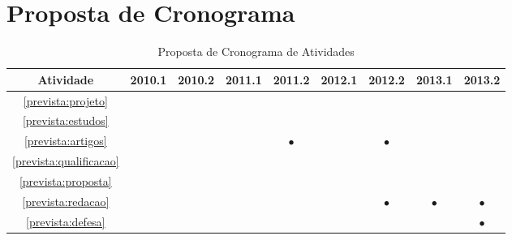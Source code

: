 \documentclass{article}
\newcommand{\newrow}{\\\hline}
\newcommand{\x}{$\bullet$}
\begin{document}

\section{Proposta de Cronograma}

\begin{table}[h]
  \centering
  \begin{tabular}{|c|c|c|c|c|c|c|c|c|} \hline
    Atividade                   & 2010.1 & 2010.2 & 2011.1 & 2011.2  & 2012.1 & 2012.2  & 2013.1 & 2013.2 \newrow
    \ref{prevista:projeto}      &        &        &        &         &        &         &        &        \newrow
    \ref{prevista:estudos}      &        &        &        &         &        &         &        &        \newrow
    \ref{prevista:artigos}      &        &        &        & \x      &        & \x      &        &        \newrow
    \ref{prevista:qualificacao} &        &        &        &         &        &         &        &        \newrow
    \ref{prevista:proposta}     &        &        &        &         &        &         &        &        \newrow
    \ref{prevista:redacao}      &        &        &        &         &        & \x      & \x     & \x     \newrow
    \ref{prevista:defesa}       &        &        &        &         &        &         &        & \x     \newrow
  \end{tabular}
 \caption{Proposta de Cronograma de Atividades}
 \label{tab:cronograma}
\end{table}




\end{document}
